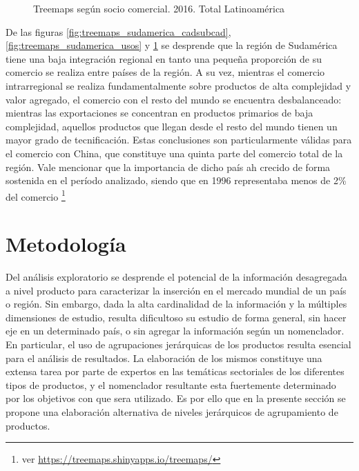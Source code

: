 \documentclass[class=article, crop=false]{standalone}
\begin{document}
\begin{figure}
	\centering
	\caption{Treemaps según socio comercial. 2016. Total Latinoamérica}
	\label{fig:treemaps_sudamerica_destino}
\end{figure}
	

De las figuras \ref{fig:treemaps_sudamerica_cadsubcad}, \ref{fig:treemaps_sudamerica_usos} y \ref{fig:treemaps_sudamerica_destino} se desprende que la región de Sudamérica tiene una baja integración regional en tanto una pequeña proporción de su comercio se realiza entre países de la región. A su vez, mientras el comercio intrarregional se realiza fundamentalmente sobre productos de alta complejidad y valor agregado, el comercio con el resto del mundo se encuentra desbalanceado: mientras las exportaciones se concentran en productos primarios de baja complejidad, aquellos productos que llegan desde el resto del mundo tienen un mayor grado de tecnificación. Estas conclusiones son particularmente válidas para el comercio con China, que constituye una quinta parte del comercio total de la región. Vale mencionar que la importancia de dicho país ah crecido de forma sostenida en el período analizado, siendo que en 1996 representaba menos de 2\% del comercio \footnote{ver \hyperlink{https://treemaps.shinyapps.io/treemaps/}{https://treemaps.shinyapps.io/treemaps/}}

\section{Metodología}

Del análisis exploratorio se desprende el potencial de la información desagregada a nivel producto para caracterizar la inserción en el mercado mundial de un país o región. Sin embargo, dada la alta cardinalidad de la información y la múltiples dimensiones de estudio, resulta dificultoso su estudio de forma general, sin hacer eje en un determinado país, o sin agregar la información según un nomenclador. En particular, el uso de agrupaciones jerárquicas de los productos resulta esencial para el análisis de resultados. La elaboración de los mismos constituye una extensa tarea por parte de expertos en las temáticas sectoriales de los diferentes tipos de productos, y el nomenclador resultante esta fuertemente determinado por los objetivos con que sera utilizado. Es por ello que en la presente sección se propone una elaboración alternativa de niveles jerárquicos de agrupamiento de productos. 
\end{document}

